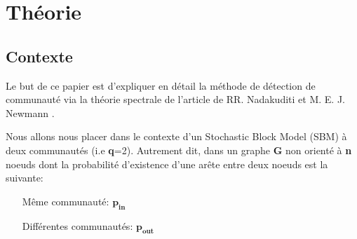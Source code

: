 \section{Théorie}
\subsection{Contexte}
Le but de ce papier est d'expliquer en détail la méthode de détection de communauté via la théorie spectrale de l'article de RR. Nadakuditi et M. E. J. Newmann .

Nous allons nous placer dans le contexte d'un Stochastic Block Model (SBM) à deux communautés (i.e \textbf{q}=2).
Autrement dit, dans un graphe \textbf{G} non orienté à \textbf{n} noeuds dont la probabilité d'existence d'une arête entre deux noeuds est la suivante:
\begin{itemize}
    \item[Même communauté:] $\mathbf{p_{in}}$  
    \item[Différentes communautés:] $\mathbf{p_{out}}$\\
\end{itemize}

